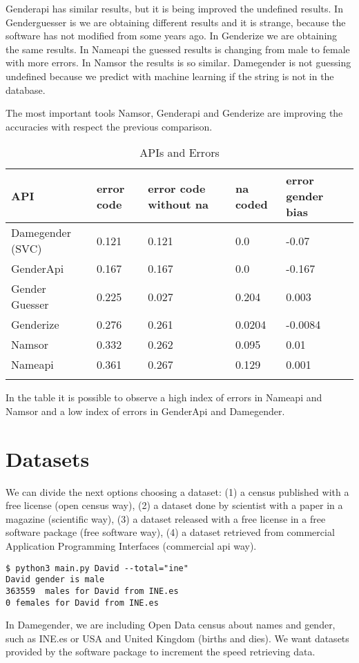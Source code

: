 \documentclass[a4paper]{article}
\begin{document}
Genderapi has similar results, but it is being improved the undefined
results. In Genderguesser is we are obtaining different results and it
is strange, because the software has not modified from some years
ago. In Genderize we are obtaining the same results. In Nameapi the
guessed results is changing from male to female with more errors. In
Namsor the results is so similar. Damegender is not guessing undefined
because we predict with machine learning if the string is not in the
database.

The most important tools Namsor, Genderapi and Genderize are improving the
accuracies with respect the previous comparison.

\begin{longtable}[]{@{}lllll@{}}
\toprule
API & error code & error code without na & na coded & error gender bias\tabularnewline
\midrule
\endhead
Damegender (SVC)\footnotemark[1] & 0.121 & 0.121 & 0.0 & -0.07\tabularnewline
GenderApi & 0.167 & 0.167 & 0.0 & -0.167\tabularnewline
Gender Guesser & 0.225 & 0.027 & 0.204 & 0.003\tabularnewline
Genderize & 0.276 & 0.261 & 0.0204 & -0.0084 \tabularnewline 
Namsor & 0.332 & 0.262 & 0.095 & 0.01 \tabularnewline
Nameapi & 0.361 & 0.267 & 0.129 & 0.001 \tabularnewline
\bottomrule
\caption{APIs and Errors}
\label{table:ApisAndErrors}
\end{longtable}

In the table it is possible to observe a high index of errors in
Nameapi and Namsor and a low index of errors in GenderApi
and Damegender.


\section*{Datasets}

We can divide the next options choosing a dataset: (1) a census
published with a free license (open census way), (2) a dataset done by
scientist with a paper in a magazine (scientific way), (3) a dataset
released with a free license in a free software package (free software
way), (4) a dataset retrieved from commercial Application Programming
Interfaces (commercial api way).

\begin{verbatim}
$ python3 main.py David --total="ine"
David gender is male
363559  males for David from INE.es
0 females for David from INE.es
\end{verbatim}

In Damegender, we are including Open Data census about names and
gender, such as INE.es or USA and United Kingdom (births and dies). We
want datasets provided by the software package to increment the speed
retrieving data.
\end{document}

